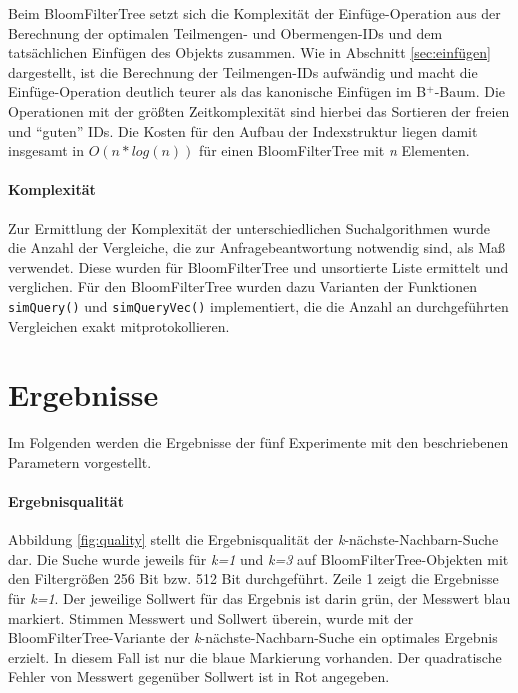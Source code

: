 Beim BloomFilterTree setzt sich die Komplexität der Einfüge-Operation aus der Berechnung der optimalen Teilmengen- und Obermengen-IDs und dem tatsächlichen Einfügen des Objekts zusammen. Wie in Abschnitt \ref{sec:einfügen} dargestellt, ist die Berechnung der Teilmengen-IDs aufwändig und macht die Einfüge-Operation deutlich teurer als das kanonische Einfügen im B$^+$-Baum. Die Operationen mit der größten Zeitkomplexität sind hierbei das Sortieren der freien und "`guten"' IDs. Die Kosten für den Aufbau der Indexstruktur liegen damit insgesamt in $O(n\ast log(n))$ für einen BloomFilterTree mit \textit{n} Elementen. 
\paragraph*{Komplexität}
Zur Ermittlung der Komplexität der unterschiedlichen Suchalgorithmen wurde die Anzahl der Vergleiche, die zur Anfragebeantwortung notwendig sind, als Maß verwendet. Diese wurden für BloomFilterTree und unsortierte Liste ermittelt und verglichen. Für den BloomFilterTree wurden dazu Varianten der Funktionen \texttt{simQuery()} und \texttt{simQueryVec()} implementiert, die die Anzahl an durchgeführten Vergleichen exakt mitprotokollieren.
\newpage
\enlargethispage{2\baselineskip}
\section{Ergebnisse}\label{sec:ergebnisse}
Im Folgenden werden die Ergebnisse der fünf Experimente mit den beschriebenen Parametern vorgestellt. 
\paragraph*{Ergebnisqualität}
Abbildung \ref{fig:quality} stellt die Ergebnisqualität der \textit{k}-nächste-Nachbarn-Suche dar. Die Suche wurde jeweils für \textit{k=1} und \textit{k=3} auf BloomFilterTree-Objekten mit den Filtergrößen 256 Bit bzw. 512 Bit durchgeführt. Zeile 1 zeigt die Ergebnisse für \textit{k=1}. Der jeweilige Sollwert für das Ergebnis ist darin grün, der Messwert blau markiert. Stimmen Messwert und Sollwert überein, wurde mit der BloomFilterTree-Variante der \textit{k}-nächste-Nachbarn-Suche ein optimales Ergebnis erzielt. In diesem Fall ist nur die blaue Markierung vorhanden. Der quadratische Fehler von Messwert gegenüber Sollwert ist in Rot angegeben.

